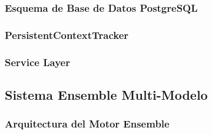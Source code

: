 \subsubsection{Esquema de Base de Datos PostgreSQL}
\label{subsubsec:esquema-bd}


\subsubsection{PersistentContextTracker}
\label{subsubsec:persistent-context-tracker}


\subsubsection{Service Layer}
\label{subsubsec:service-layer}


\subsection{Sistema Ensemble Multi-Modelo}
\label{subsec:ensemble-impl}

\subsubsection{Arquitectura del Motor Ensemble}
\label{subsubsec:arquitectura-ensemble}


